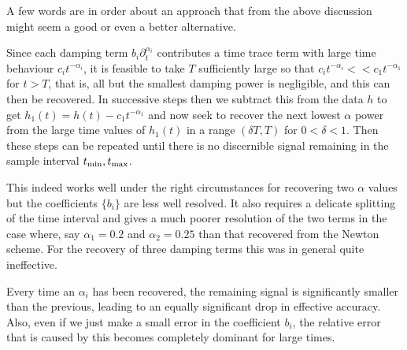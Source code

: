 
A few words are in order about an approach that from the above discussion
might seem a good or even a better alternative.

Since each damping term 
$b_i \partial^{\alpha_i}_t$ 
contributes a time trace term
with large time behaviour $c_i t^{-\alpha_i}$, it is feasible to take
$T$ sufficiently large so that
$c_i t^{-\alpha_i} <\!\!\!< c_1 t^{-\alpha_1}$ for $t>T$, that is, all but the
smallest damping power is negligible, and this can then be recovered.
In successive steps then we subtract this from the data $h$ to
get $h_1(t) = h(t) - c_1t^{-\alpha_1}$ and now seek to recover the next
lowest $\alpha$ power from the large time values of $h_1(t)$  in a range
$(\delta T,T)$ for $0<\delta<1$.
Then these steps can be repeated until there is no discernible signal remaining
in the sample interval $t_{\rm min},t_{\rm max}$.

This indeed works well under the right circumstances
for recovering two $\alpha$ values but the
coefficients $\{b_i\}$ are less well resolved.
It also requires a delicate splitting of the time interval and gives a
much poorer resolution of the two terms in the case where, say
$\alpha_1=0.2$ and $\alpha_2=0.25$  than that recovered from the Newton scheme.
For the recovery of three damping terms this was in general quite
ineffective.

Every time an $\alpha_i$ has been recovered, the remaining signal is significantly smaller than the previous, leading to an equally significant drop in effective accuracy.
Also, even if we just make a small error in the coefficient $b_i$, the relative error that is caused by this becomes completely dominant for large times. 

